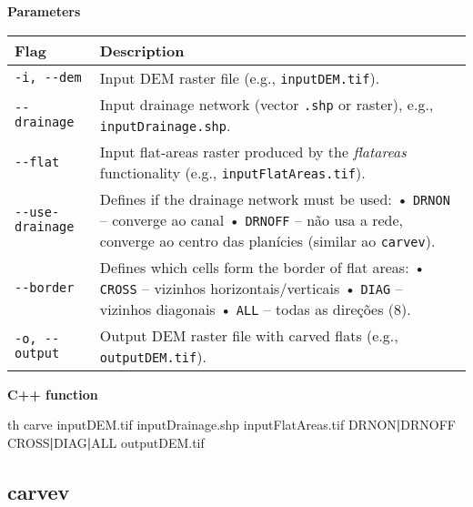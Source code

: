 \documentclass[
]{book}
\newenvironment{Shaded}{\begin{snugshade}}{\end{snugshade}}
\newcommand{\ExtensionTok}[1]{#1}
\newcommand{\KeywordTok}[1]{\textcolor[rgb]{0.13,0.29,0.53}{\textbf{#1}}}
\newcommand{\NormalTok}[1]{#1}
\theoremstyle{definition}
\theoremstyle{definition}
\theoremstyle{definition}
\theoremstyle{definition}
\theoremstyle{remark}
\begin{document}
\textbf{Parameters}

\begin{longtable}[]{@{}
  >{\raggedright\arraybackslash}p{}
  >{\raggedright\arraybackslash}p{}@{}}
\toprule\noalign{}
\begin{minipage}[b]{\linewidth}\raggedright
Flag
\end{minipage} & \begin{minipage}[b]{\linewidth}\raggedright
Description
\end{minipage} \\
\midrule\noalign{}
\endhead
\bottomrule\noalign{}
\endlastfoot
\texttt{-i,\ -\/-dem} & Input DEM raster file (e.g., \texttt{inputDEM.tif}). \\
\texttt{-\/-drainage} & Input drainage network (vector \texttt{.shp} or raster), e.g., \texttt{inputDrainage.shp}. \\
\texttt{-\/-flat} & Input flat-areas raster produced by the \emph{flatareas} functionality (e.g., \texttt{inputFlatAreas.tif}). \\
\texttt{-\/-use-drainage} & Defines if the drainage network must be used: • \texttt{DRNON} -- converge ao canal • \texttt{DRNOFF} -- não usa a rede, converge ao centro das planícies (similar ao \texttt{carvev}). \\
\texttt{-\/-border} & Defines which cells form the border of flat areas: • \texttt{CROSS} -- vizinhos horizontais/verticais • \texttt{DIAG} -- vizinhos diagonais • \texttt{ALL} -- todas as direções (8). \\
\texttt{-o,\ -\/-output} & Output DEM raster file with carved flats (e.g., \texttt{outputDEM.tif}). \\
\end{longtable}

\textbf{C++ function}

\begin{Shaded}
\begin{Highlighting}[]
\ExtensionTok{th}\NormalTok{ carve inputDEM.tif inputDrainage.shp inputFlatAreas.tif DRNON}\KeywordTok{|}\ExtensionTok{DRNOFF}\NormalTok{ CROSS}\KeywordTok{|}\ExtensionTok{DIAG}\KeywordTok{|}\ExtensionTok{ALL}\NormalTok{ outputDEM.tif}
\end{Highlighting}
\end{Shaded}

\subsection{carvev}\label{carvev}
\end{document}

